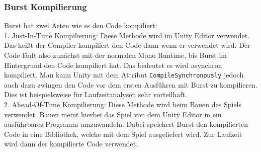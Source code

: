 \subsubsection{Burst Kompilierung}
Burst hat zwei Arten wie es den Code kompiliert:\\
1. Just-In-Time Kompilierung: Diese Methode wird im Unity Editor verwendet. Das heißt der Compiler kompiliert den Code dann wenn er verwendet wird. Der Code läuft also zunächst mit der normalen Mono Runtime, bis Burst im Hintergrund den Code kompiliert hat. Das bedeutet es wird asynchron kompiliert. Man kann Unity mit dem Attribut \texttt{CompileSynchronously} jedoch auch dazu zwingen den Code vor dem ersten Ausführen mit Burst zu kompilieren. Dies ist beispielsweise für Laufzeitanalysen sehr vorteilhaft.\\
2. Ahead-Of-Time Kompilierung: Diese Methode wird beim Bauen des Spiels verwendet. Bauen meint hierbei das Spiel von dem Unity Editor in ein ausführbares Programm umzuwandeln. Dabei speichert Burst den kompilierten Code in eine Bibliothek, welche mit dem Spiel ausgeliefert wird. Zur Laufzeit wird dann der kompilierte Code verwendet.
